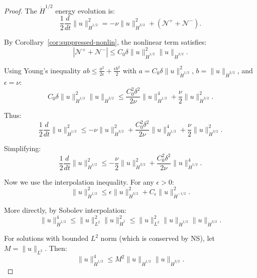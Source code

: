 \documentclass[11pt]{article}
\theoremstyle{definition}
\newcommand{\cN}{\mathcal{N}}
\begin{document}
\begin{proof}
The $\dot{H}^{1/2}$ energy evolution is:
\begin{equation}
\frac{1}{2}\frac{d}{dt}\|u\|_{\dot{H}^{1/2}}^2 = -\nu\|u\|_{\dot{H}^{3/2}}^2 + (\cN^+ + \cN^-).
\end{equation}

By Corollary~\ref{cor:suppressed-nonlin}, the nonlinear term satisfies:
\begin{equation}
|\cN^+ + \cN^-| \leq C_0 \delta \|u\|_{\dot{H}^{1/2}}^2 \|u\|_{\dot{H}^{3/2}}.
\end{equation}

Using Young's inequality $ab \leq \frac{a^2}{2\epsilon} + \frac{\epsilon b^2}{2}$ with $a = C_0 \delta \|u\|_{\dot{H}^{1/2}}^2$, $b = \|u\|_{\dot{H}^{3/2}}$, and $\epsilon = \nu$:
\begin{equation}
C_0 \delta \|u\|_{\dot{H}^{1/2}}^2 \|u\|_{\dot{H}^{3/2}} \leq \frac{C_0^2 \delta^2}{2\nu} \|u\|_{\dot{H}^{1/2}}^4 + \frac{\nu}{2} \|u\|_{\dot{H}^{3/2}}^2.
\end{equation}

Thus:
\begin{equation}
\frac{1}{2}\frac{d}{dt}\|u\|_{\dot{H}^{1/2}}^2 \leq -\nu\|u\|_{\dot{H}^{3/2}}^2 + \frac{C_0^2 \delta^2}{2\nu} \|u\|_{\dot{H}^{1/2}}^4 + \frac{\nu}{2} \|u\|_{\dot{H}^{3/2}}^2.
\end{equation}

Simplifying:
\begin{equation}
\frac{1}{2}\frac{d}{dt}\|u\|_{\dot{H}^{1/2}}^2 \leq -\frac{\nu}{2}\|u\|_{\dot{H}^{3/2}}^2 + \frac{C_0^2 \delta^2}{2\nu} \|u\|_{\dot{H}^{1/2}}^4.
\end{equation}

Now we use the interpolation inequality. For any $\epsilon > 0$:
\begin{equation}
\|u\|_{\dot{H}^{1/2}}^2 \leq \epsilon \|u\|_{\dot{H}^{3/2}}^2 + C_\epsilon \|u\|_{\dot{H}^{-1/2}}^2.
\end{equation}

More directly, by Sobolev interpolation:
\begin{equation}
\|u\|_{\dot{H}^{1/2}}^4 \leq \|u\|_{L^2}^2 \|u\|_{\dot{H}^1}^2 \leq \|u\|_{L^2}^2 \|u\|_{\dot{H}^{1/2}} \|u\|_{\dot{H}^{3/2}}.
\end{equation}

For solutions with bounded $L^2$ norm (which is conserved by NS), let $M = \|u\|_{L^2}$. Then:
\begin{equation}
\|u\|_{\dot{H}^{1/2}}^4 \leq M^2 \|u\|_{\dot{H}^{1/2}} \|u\|_{\dot{H}^{3/2}}.
\end{equation}


\end{proof}
\end{document}
